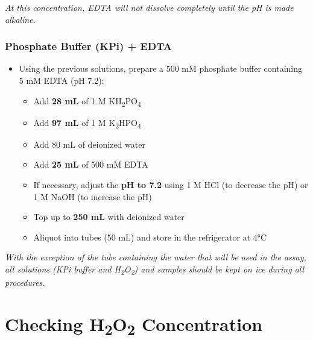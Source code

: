 \documentclass[
  9pt,
  american,
  a5paper,
  extrafontsizes,onecolumn,openright
  ]{memoir}
\providecommand{\tightlist}{%
  \setlength{\itemsep}{0pt}\setlength{\parskip}{0pt}}
\begin{document}
\begin{greybox}[frametitle = Note]
\emph{At this concentration, EDTA will not dissolve completely until the pH is made alkaline.}

\end{greybox}

\subsubsection{Phosphate Buffer (KPi) + EDTA}\label{phosphate-buffer-kpi-edta-1}

\begin{itemize}
\tightlist
\item
  Using the previous solutions, prepare a 500 mM phosphate buffer containing 5 mM EDTA (pH 7.2):

  \begin{itemize}
  \tightlist
  \item
    Add \textbf{28 mL} of 1 M KH\textsubscript{2}PO\textsubscript{4}
  \item
    Add \textbf{97 mL} of 1 M K\textsubscript{2}HPO\textsubscript{4}
  \item
    Add 80 mL of deionized water
  \item
    Add \textbf{25 mL} of 500 mM EDTA
  \item
    If necessary, adjust the \textbf{pH to 7.2} using 1 M HCl (to decrease the pH) or 1 M NaOH (to increase the pH)
  \item
    Top up to \textbf{250 mL} with deionized water
  \item
    Aliquot into tubes (50 mL) and store in the refrigerator at 4°C
  \end{itemize}
\end{itemize}

\begin{greybox}[frametitle = Note]
\emph{With the exception of the tube containing the water that will be used in the assay, all solutions (KPi buffer and H\textsubscript{2}O\textsubscript{2}) and samples should be kept on ice during all procedures.}

\end{greybox}

\section{\texorpdfstring{Checking H\textsubscript{2}O\textsubscript{2} Concentration}{Checking H2O2 Concentration}}\label{checking_h2o2}
\end{document}
